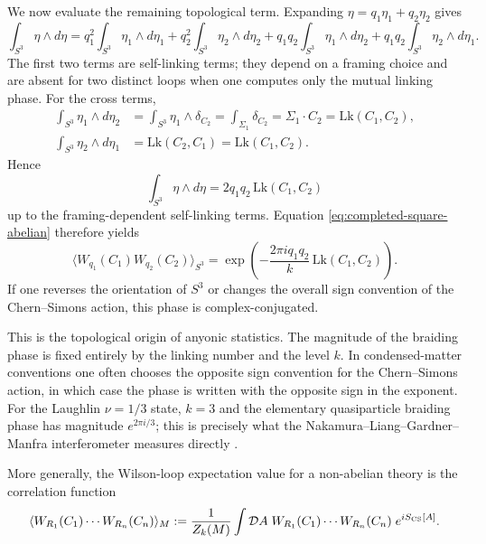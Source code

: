 \begin{example}
\noindent We now evaluate the remaining topological term. Expanding $\eta = q_1\eta_1 + q_2\eta_2$ gives
\begin{equation*}
\int_{S^3}\eta\wedge d\eta
=
q_1^2\int_{S^3}\eta_1\wedge d\eta_1
+ q_2^2\int_{S^3}\eta_2\wedge d\eta_2
+ q_1q_2\int_{S^3}\eta_1\wedge d\eta_2
+ q_1q_2\int_{S^3}\eta_2\wedge d\eta_1.
\end{equation*}
The first two terms are self-linking terms; they depend on a framing choice and are absent for two distinct loops when one computes only the mutual linking phase. For the cross terms,
\begin{align*}
\int_{S^3}\eta_1\wedge d\eta_2
&=
\int_{S^3}\eta_1\wedge \delta_{C_2}
=
\int_{\Sigma_1}\delta_{C_2}
=
\Sigma_1\cdot C_2
=
\mathrm{Lk}(C_1,C_2), \\
\int_{S^3}\eta_2\wedge d\eta_1
&=
\mathrm{Lk}(C_2,C_1)
=
\mathrm{Lk}(C_1,C_2).
\end{align*}
Hence
\begin{equation*}
\int_{S^3}\eta\wedge d\eta = 2q_1q_2\,\mathrm{Lk}(C_1,C_2)
\end{equation*}
up to the framing-dependent self-linking terms. Equation \eqref{eq:completed-square-abelian} therefore yields
\begin{equation*}
\langle W_{q_1}(C_1)W_{q_2}(C_2)\rangle_{S^3}
=
\exp\left(-\frac{2\pi i q_1 q_2}{k}\,\mathrm{Lk}(C_1,C_2)\right).
\end{equation*}
If one reverses the orientation of $S^3$ or changes the overall sign convention of the Chern--Simons action, this phase is complex-conjugated.

\medskip

\noindent This is the topological origin of anyonic statistics. The magnitude of the braiding phase is fixed entirely by the linking number and the level $k$. In condensed-matter conventions one often chooses the opposite sign convention for the Chern--Simons action, in which case the phase is written with the opposite sign in the exponent. For the Laughlin $\nu = 1/3$ state, $k=3$ and the elementary quasiparticle braiding phase has magnitude $e^{2\pi i/3}$; this is precisely what the Nakamura--Liang--Gardner--Manfra interferometer measures directly \cite{Nakamura2020}.
\end{example}

\noindent More generally, the Wilson-loop expectation value for a non-abelian theory is the correlation function
\begin{equation}\label{eq:Wilson-expectation}
\langle W_{R_1}(C_1)\cdots W_{R_n}(C_n)\rangle_M := \frac{1}{Z_k(M)}\int \mathcal{D}A\; W_{R_1}(C_1)\cdots W_{R_n}(C_n)\; e^{iS_{\operatorname{CS}}[A]}.
\end{equation}

